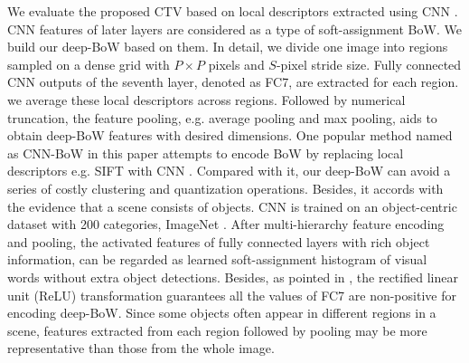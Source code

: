 \documentclass[journal]{IEEEtran}
\begin{document}
We evaluate the proposed CTV based on local descriptors extracted using CNN \cite{krizhevsky2012imagenet}. CNN features of later layers are considered as a type of soft-assignment BoW. We build our deep-BoW based on them. In detail, we divide one image into regions sampled on a dense grid with $P \times P$ pixels and $S$-pixel stride size. Fully connected CNN outputs of the seventh layer, denoted as FC7, are extracted for each region. we average these local descriptors across regions. Followed by numerical truncation, the feature pooling, e.g. average pooling and max pooling, aids to obtain deep-BoW features with desired dimensions.
One popular method named as CNN-BoW in this paper attempts to encode BoW by replacing local descriptors e.g. SIFT with CNN \cite{kwitt2012scene, cinbis2015approximate, gong2014multi}.
Compared with it, our deep-BoW can avoid a series of costly clustering and quantization operations. Besides, it accords with the evidence that a scene consists of objects. CNN is trained on an object-centric dataset with 200 categories, ImageNet \cite{deng2009imagenet}. After multi-hierarchy feature encoding and pooling, the activated features of fully connected layers with rich object information, can be regarded as learned soft-assignment histogram of visual words without extra object detections. Besides, as pointed in \cite{gong2014multi}, the rectified linear unit (ReLU) transformation guarantees all the values of FC7 are non-positive for encoding deep-BoW. Since some objects often appear in different regions in a scene, features extracted from each region followed by pooling may be more representative than those from the whole image.
\end{document}
